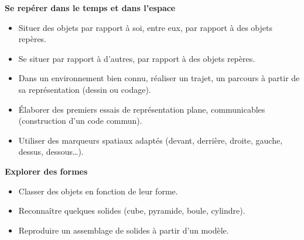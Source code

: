 \begin{prerequis}
{\small
{\bf Se repérer dans le temps et dans l'espace}
   \begin{itemize}
      \item Situer des objets par rapport à soi, entre eux, par rapport à des objets repères.
      \item Se situer par rapport à d’autres, par rapport à des objets repères.
      \item Dans un environnement bien connu, réaliser un trajet, un parcours à partir de sa représentation (dessin ou codage).
      \item Élaborer des premiers essais de représentation plane, communicables (construction d’un code commun).
      \item Utiliser des marqueurs spatiaux adaptés (devant, derrière, droite, gauche, dessus, dessous\dots).
   \end{itemize}
{\bf Explorer des formes}
   \begin{itemize}
      \item Classer des objets en fonction de leur forme.
      \item Reconnaître quelques solides (cube, pyramide, boule, cylindre).
      \item Reproduire un assemblage de solides à partir d’un modèle.
   \end{itemize}}
\end{prerequis}

